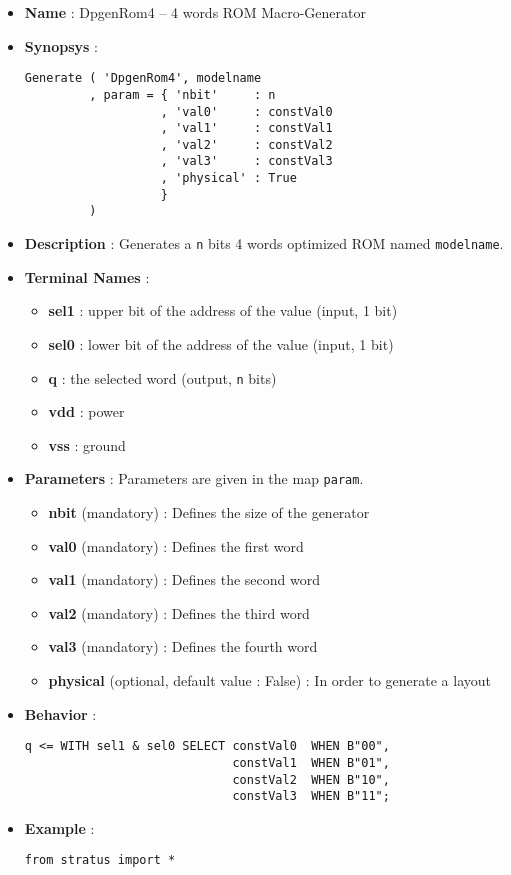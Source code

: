 \begin{itemize}
    \item \textbf{Name} : DpgenRom4 -- 4 words ROM Macro-Generator
    \item \textbf{Synopsys} :
\begin{verbatim}
Generate ( 'DpgenRom4', modelname
         , param = { 'nbit'     : n
                   , 'val0'     : constVal0
                   , 'val1'     : constVal1
                   , 'val2'     : constVal2
                   , 'val3'     : constVal3
                   , 'physical' : True                   
                   }
         )
\end{verbatim}
    \item \textbf{Description} : Generates a \verb-n- bits 4 words optimized ROM named \verb-modelname-.
    \item \textbf{Terminal Names} :
    \begin{itemize}
        \item \textbf{sel1} : upper bit of the address of the value (input, 1 bit)
        \item \textbf{sel0} : lower bit of the address of the value (input, 1 bit)
        \item \textbf{q} : the selected word (output, \verb-n- bits)
        \item \textbf{vdd} : power
        \item \textbf{vss} : ground
    \end{itemize}
    \item \textbf{Parameters} : Parameters are given in the map \verb-param-.
    \begin{itemize}
        \item \textbf{nbit} (mandatory) : Defines the size of the generator
        \item \textbf{val0} (mandatory) : Defines the first word
        \item \textbf{val1} (mandatory) : Defines the second word
        \item \textbf{val2} (mandatory) : Defines the third word
        \item \textbf{val3} (mandatory) : Defines the fourth word
        \item \textbf{physical} (optional, default value : False) : In order to generate a layout        
    \end{itemize}
    \item \textbf{Behavior} :
\begin{verbatim}
q <= WITH sel1 & sel0 SELECT constVal0  WHEN B"00",
                             constVal1  WHEN B"01",
                             constVal2  WHEN B"10",
                             constVal3  WHEN B"11";
\end{verbatim}
    \item \textbf{Example} :
\begin{verbatim}
from stratus import *


\end{verbatim}
\end{itemize}
